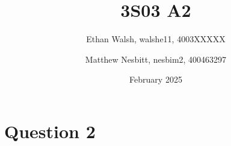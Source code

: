 \documentclass{article}
\title{3S03 A2}
\author{Ethan Walsh, walshe11, 4003XXXXX}
\author{Matthew Nesbitt, nesbim2, 400463297}
\date{February 2025}
\begin{document}
\maketitle
\section{Question 2}
\end{document}
